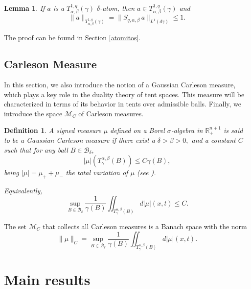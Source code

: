 \documentclass[leqno,11pt]{amsart}
\theoremstyle{plain}
\newtheorem{lemma}{Lemma}
\newtheorem{defi}{Definition}
\theoremstyle{remark}
\begin{document}
{\begin{lemma}\label{NOSE}If $a$ is a $T^{1,q}_{\alpha, \beta}(\gamma)$ $\delta$-atom, then $a\in T^{1,q}_{\alpha, \beta} (\gamma)$ and
\[\|a\|_{T^{1,q}_{\alpha, \beta}(\gamma)}=\|S_{q,\alpha, \beta}\, a\|_{L^1(d\gamma)}\leq 1.\]
\end{lemma}

The proof can be found in Section \ref{atomitos}.

\subsection{Carleson Measure}

In this section, we also introduce the notion of a Gaussian Carleson measure, which plays a key role in the duality theory of tent spaces. This measure will be characterized in terms of its behavior in tents over admissible balls. Finally, we introduce the space $\mathscr{M}_C$ of Carleson measures.


\begin{defi} A signed measure $\mu$ defined on a Borel $\sigma$-algebra in $\mathbb{R}^{n+1}_+$ is said to be a Gaussian Carleson measure if  there exist a $\delta>\beta>0,$ and a constant $C$ such that for any ball $B\in \mathscr{B}_\delta,$
\begin{equation}
|\mu|(T_\gamma^{\alpha, \beta}(B)) \leq C  \gamma(B),
\end{equation}
being $|\mu|=\mu_++\mu_-$ the total variation of $\mu$ (see \cite[Chapters 2 \& 6]{ru}).
 

Equivalently,
\begin{equation}
\sup_{B\in \mathscr{B}_\delta}\frac{1}{ \gamma(B)} \iint_{T^{\alpha, \beta}_\gamma(B)} d|\mu|(x,t) \leq C.
\end{equation}
\end{defi}
The set $\mathscr{M}_C$ that collects all Carleson measures is a Banach space with the norm
\[\|\mu\|_C=\sup_{B\in \mathscr{B}_\delta}\frac{1}{ \gamma(B)} \iint_{T^{\alpha,\beta}_\gamma(B)} d|\mu|(x,t).\]

 
\section{Main results}\label{main}
 
}
\end{document}
